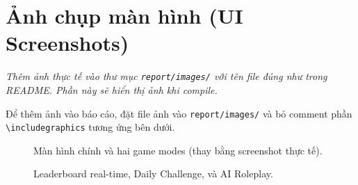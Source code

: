 \documentclass[12pt,a4paper]{article}
\begin{document}
\section{Ảnh chụp màn hình (UI Screenshots)}
\label{sec:screenshots}

\emph{Thêm ảnh thực tế vào thư mục \texttt{report/images/} với tên file đúng như trong README.
Phần này sẽ hiển thị ảnh khi compile.}

Để thêm ảnh vào báo cáo, đặt file ảnh vào \texttt{report/images/} và bỏ comment phần
\texttt{\textbackslash includegraphics} tương ứng bên dưới.

\begin{figure}[H]
\centering
\hfill
{}
\hfill
{}
\caption{Màn hình chính và hai game modes (thay bằng screenshot thực tế).}
\end{figure}

\begin{figure}[H]
\centering
\hfill
{}
\hfill
{}
\caption{Leaderboard real-time, Daily Challenge, và AI Roleplay.}
\end{figure}
\end{document}
